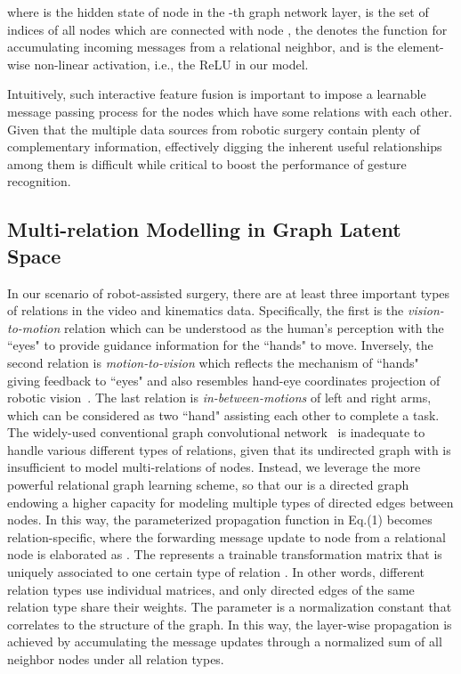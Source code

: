 \documentclass[letterpaper, 10 pt, conference]{ieeeconf}
\begin{document}
where  is the hidden state of node  in the -th graph network layer,  is the set of indices of all nodes which are connected with node , the  denotes the function for accumulating incoming messages from a relational neighbor, and  is the element-wise non-linear activation, i.e., the ReLU in our model.

Intuitively, such interactive feature fusion is important to impose a learnable message passing process for the nodes which have some relations with each other.
Given that the multiple data sources from robotic surgery contain plenty of complementary information, effectively digging the inherent useful relationships among them is difficult while critical to boost the performance of gesture recognition.

\subsection{Multi-relation Modelling in Graph Latent Space}

In our scenario of robot-assisted surgery, there are at least three important types of relations in the video and kinematics data. Specifically, the first is the \emph{vision-to-motion} relation which can be understood as the human's perception with the ``eyes" to provide guidance information for the ``hands" to move. Inversely, the second relation is \emph{motion-to-vision} which reflects the mechanism of ``hands" giving feedback to ``eyes" and also resembles hand-eye coordinates projection of robotic vision~\cite{tsai1989new}. The last relation is \emph{in-between-motions} of left and right arms, which can be considered as two ``hand" assisting each other to complete a task.
The widely-used conventional graph convolutional network~\cite{kipf2016semi} is inadequate to handle various different types of relations, given that its undirected graph with  is insufficient to model multi-relations of nodes. Instead, we leverage the more powerful relational graph learning scheme,
so that our  is a directed graph endowing a higher capacity for modeling multiple types of directed edges between nodes. In this way, the parameterized propagation function  in Eq.(1) becomes relation-specific, where the forwarding message update to node  from a relational node  is elaborated as . The  represents a trainable transformation matrix that is uniquely associated to one certain type of relation .
In other words, different relation types use individual matrices, and only directed edges of the same relation type share their weights.
The parameter  is a normalization constant that correlates to the structure of the graph.
In this way, the layer-wise propagation is achieved by accumulating the message updates through a normalized sum of all neighbor nodes under all relation types.
\end{document}
